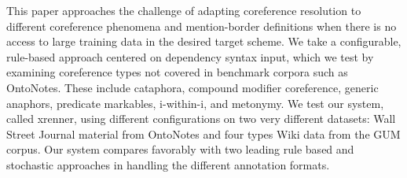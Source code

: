 This paper approaches the challenge of adapting coreference resolution to different coreference phenomena and mention-border definitions when there is no access to large training data in the desired target scheme. We take a configurable, rule-based approach centered on dependency syntax input, which we test by examining coreference types not covered in benchmark corpora such as OntoNotes. These include cataphora, compound modifier coreference, generic anaphors, predicate markables, i-within-i, and metonymy. We test our system, called xrenner, using different configurations on two very different datasets: Wall Street Journal material from OntoNotes and four types Wiki data from the GUM corpus. Our system compares favorably with two leading rule based and stochastic approaches in handling the different annotation formats.
